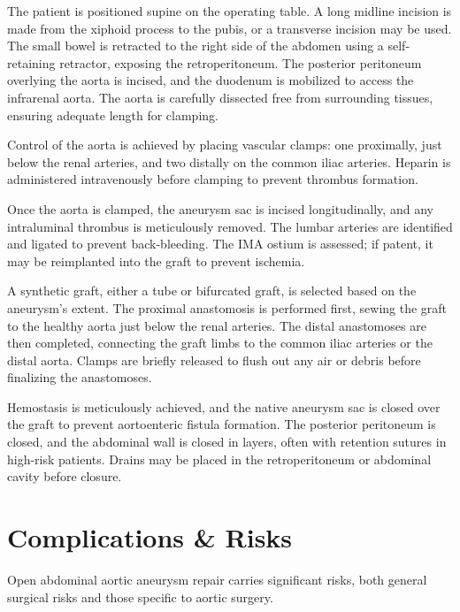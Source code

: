 The patient is positioned supine on the operating table. A long midline incision is made from the xiphoid process to the pubis, or a transverse incision may be used. The small bowel is retracted to the right side of the abdomen using a self-retaining retractor, exposing the retroperitoneum. The posterior peritoneum overlying the aorta is incised, and the duodenum is mobilized to access the infrarenal aorta. The aorta is carefully dissected free from surrounding tissues, ensuring adequate length for clamping.

Control of the aorta is achieved by placing vascular clamps: one proximally, just below the renal arteries, and two distally on the common iliac arteries. Heparin is administered intravenously before clamping to prevent thrombus formation.

Once the aorta is clamped, the aneurysm sac is incised longitudinally, and any intraluminal thrombus is meticulously removed. The lumbar arteries are identified and ligated to prevent back-bleeding. The IMA ostium is assessed; if patent, it may be reimplanted into the graft to prevent ischemia.

A synthetic graft, either a tube or bifurcated graft, is selected based on the aneurysm's extent. The proximal anastomosis is performed first, sewing the graft to the healthy aorta just below the renal arteries. The distal anastomoses are then completed, connecting the graft limbs to the common iliac arteries or the distal aorta. Clamps are briefly released to flush out any air or debris before finalizing the anastomoses.

Hemostasis is meticulously achieved, and the native aneurysm sac is closed over the graft to prevent aortoenteric fistula formation. The posterior peritoneum is closed, and the abdominal wall is closed in layers, often with retention sutures in high-risk patients. Drains may be placed in the retroperitoneum or abdominal cavity before closure.

\section*{Complications \& Risks}
Open abdominal aortic aneurysm repair carries significant risks, both general surgical risks and those specific to aortic surgery.

